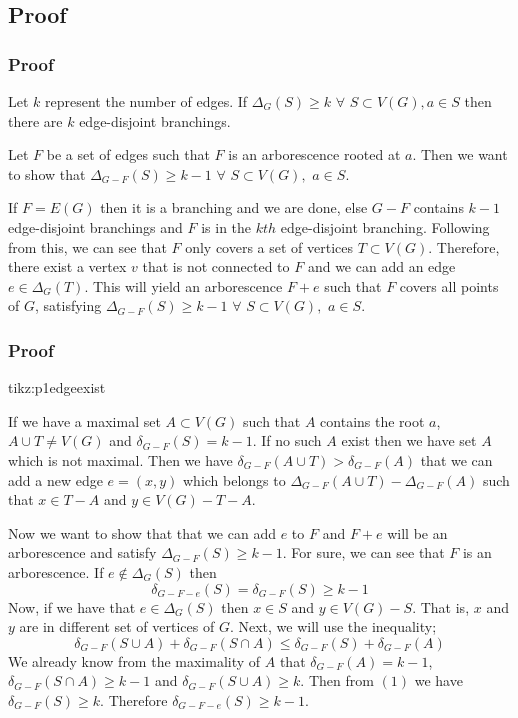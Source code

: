 \documentclass[8pt]{beamer}
\begin{document}
\subsection{Proof}
\begin{frame}
\frametitle{Proof}

Let $k$ represent the number of edges. If $\Delta_G(S) \ge k$ $\forall$ $S\subset V(G), a\in S$ then there are $k$ edge-disjoint branchings. 

Let $F$ be a set of edges such that $F$ is an arborescence rooted at $a$. Then we want to show that $\Delta_{G-F}(S) \ge k-1$ $\forall$ $S\subset V(G),$ $a\in S$.

If $F=E(G)$ then it is a branching and we are done, else $G-F$ contains $k-1$ edge-disjoint branchings and $F$ is in the $kth$ edge-disjoint branching. Following from this, we can see that $F$ only covers a set of vertices $T \subset V(G)$. Therefore, there exist a vertex $v$ that is not connected to $F$ and we can add an edge $e\in \Delta_G(T)$. This will yield an arborescence $F+e$ such that $F$ covers all points of $G$, satisfying $\Delta_{G-F}(S) \ge k-1$ $\forall$ $S\subset V(G),$ $a\in S$.

\end{frame}

\begin{frame}
\frametitle{Proof}
{}
{tikz:p1edgeexist}

If we have a maximal set $A\subset V(G)$ such that $A$ contains the root $a$, $A \cup T \ne V(G)$ and $\delta_{G-F}(S) = k-1$. If no such $A$ exist then we have set $A$ which is not maximal. Then we have $\delta_{G-F}(A\cup T) > \delta_{G-F}(A)$ that we can add a new edge $e=(x,y)$ which belongs to $\Delta_{G-F}(A\cup T) - \Delta_{G-F}(A)$ such that $x\in T-A$ and $y\in V(G) -T-A$.
\end{frame}

\begin{frame}
Now we want to show that that we can add $e$ to $F$ and $F+e$ will be an arborescence and satisfy $\Delta_{G-F}(S) \ge k-1$. For sure, we can see that $F$ is an arborescence. If $e\not\in \Delta_G(S)$ then $$\delta_{G-F-e}(S) = \delta_{G-F}(S) \ge k-1$$
Now, if we have that $e\in \Delta_G(S)$ then $x\in S$ and $y\in V(G)-S$. That is, $x$ and $y$ are in different set of vertices of $G$. Next, we will use the inequality; 
\begin{equation}\delta_{G-F}(S\cup A) + \delta_{G-F}(S\cap A) \le \delta_{G-F}(S) + \delta_{G-F}(A)\end{equation}
We already know from the maximality of $A$ that $\delta_{G-F}(A)=k-1$, $\delta_{G-F}(S\cap A) \ge k-1$ and $\delta_{G-F}(S\cup A) \ge k$. Then from $(1)$ we have $\delta_{G-F}(S) \ge k$. Therefore $\delta_{G-F-e}(S) \ge k-1$. 

\end{frame}
\end{document}
